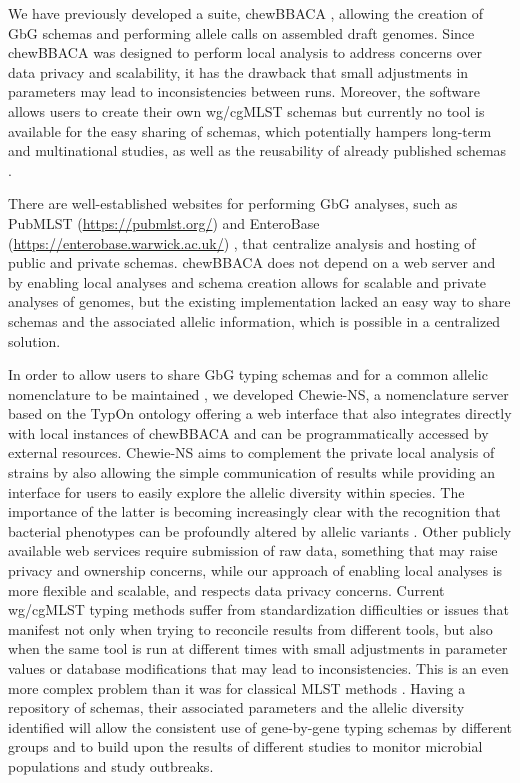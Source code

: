 We have previously developed a suite, chewBBACA \cite{silva_chewbbaca_2018}, allowing the creation of \ac{GbG} schemas and performing allele calls on assembled draft genomes. Since chewBBACA was designed to perform local analysis to address concerns over data privacy and scalability, it has the drawback that small adjustments in parameters may lead to inconsistencies between runs. Moreover, the software allows users to create their own \ac{wg/cgMLST} schemas but currently no tool is available for the easy sharing of schemas, which potentially hampers long-term and multinational studies, as well as the reusability of already published schemas \cite{isidro_virulence_2020, llarena_innuendo_2018}.

There are well-established websites for performing \ac{GbG} analyses, such as PubMLST (\url{https://pubmlst.org/}) \cite{jolley_bigsdb_2010} and EnteroBase (\url{https://enterobase.warwick.ac.uk/}) \cite{zhou_enterobase_2020}, that centralize analysis and hosting of public and private schemas. chewBBACA does not depend on a web server and by enabling local analyses and schema creation allows for scalable and private analyses of genomes, but the existing implementation lacked an easy way to share schemas and the associated allelic information, which is possible in a centralized solution.

In order to allow users to share \ac{GbG} typing schemas and for a common allelic nomenclature to be maintained \cite{carrico_bioinformatics_2013}, we developed \ac{Chewie-NS}, a nomenclature server based on the TypOn ontology \cite{vaz_typon_2014} offering a web interface that also integrates directly with local instances of chewBBACA and can be programmatically accessed by external resources. \ac{Chewie-NS} aims to complement the private local analysis of strains by also allowing the simple communication of results while providing an interface for users to easily explore the allelic diversity within species. The importance of the latter is becoming increasingly clear with the recognition that bacterial phenotypes can be profoundly altered by allelic variants \cite{van_der_linden_heterogeneity_2020, uniprot_consortium_uniprot_2019}. Other publicly available web services require submission of raw data, something that may raise privacy and ownership concerns, while our approach of enabling local analyses is more flexible and scalable, and respects data privacy concerns. Current \ac{wg/cgMLST} typing methods suffer from standardization difficulties or issues that manifest not only when trying to reconcile results from different tools, but also when the same tool is run at different times with small adjustments in parameter values or database modifications that may lead to inconsistencies. This is an even more complex problem than it was for classical \ac{MLST} methods \cite{page_comparison_2017}. Having a repository of schemas, their associated parameters and the allelic diversity identified will allow the consistent use of gene-by-gene typing schemas by different groups and to build upon the results of different studies to monitor microbial populations and study outbreaks.

